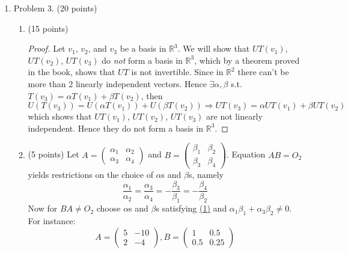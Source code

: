\documentclass[]{book}
\theoremstyle{definition}
\newcommand{\0}{\mathbf{0}}
\begin{document}
\begin{enumerate}
\item Problem 3. (20 points)
\begin{enumerate}
    \item (15 points)
    \begin{proof}
    Let $v_1$, $v_2$, and $v_3$ be a basis in $\mathbb{R}^3$. We will show that $UT(v_1)$, $UT(v_2)$, $UT(v_3)$ do \emph{not} form a basis in $\mathbb{R}^3$, which by a theorem proved in the book, shows that $UT$ is not invertible.\smallbreak
    Since in $\mathbb{R}^2$ there can't be more than 2 linearly independent vectors. Hence $\exists\alpha,\beta$ s.t. $T(v_3)=\alpha T(v_1)+\beta T(v_2)$, then
    \[U(T(v_3))=U(\alpha T(v_1))+U(\beta T(v_2))\Rightarrow UT(v_3)=\alpha UT(v_1)+\beta UT(v_2)\]
    which shows that $UT(v_1)$, $UT(v_2)$, $UT(v_3)$ are not linearly independent. Hence they do not form a basis in $\mathbb{R}^3$.
    \end{proof}
    \item (5 points)
    Let $A=\begin{pmatrix}
    \alpha_1 & \alpha_2\\
    \alpha_3 & \alpha_4
    \end{pmatrix}$ and $B=\begin{pmatrix}
    \beta_1 & \beta_2\\
    \beta_3 & \beta_4
    \end{pmatrix}$.\newline
    Equation $AB=O_2$ yields restrictions on the choice of $\alpha$s and $\beta$s, namely
    \begin{equation}\label{(1)}
    \frac{\alpha_1}{\alpha_2}=\frac{\alpha_3}{\alpha_4}=-\frac{\beta_3}{\beta_1}=-\frac{\beta_4}{\beta_2}
    \end{equation}
    Now for $BA\neq O_2$ choose $\alpha$s and $\beta$s satisfying \hyperref[(1)]{(1)} and $\alpha_1\beta_1+\alpha_3\beta_2\neq 0$. For instance:
    \[A=\begin{pmatrix}
    5 & -10\\
    2 & -4
    \end{pmatrix},B=\begin{pmatrix}
    1 & 0.5\\
    0.5 & 0.25
    \end{pmatrix}\]
\end{enumerate}


\end{enumerate}
\end{document}
